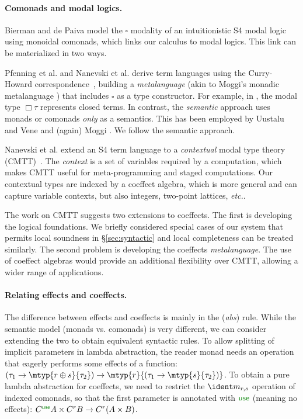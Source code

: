 \vspace{-1em}
\paragraph{Comonads and modal logics.}

Bierman and de Paiva \cite{logic-intuitionistic-modal} model the
$\square$ modality of an intuitionistic S4 modal logic using monoidal
comonads, which links our calculus to modal logics.  This link can be
materialized in two ways.

Pfenning et al. and Nanevski et al.  derive term languages using the Curry-Howard
correspondence~\cite{logic-modal-reconstruction,logic-intuitionistic-modal,logic-cmtt},
building a \emph{metalanguage} (akin to Moggi's monadic metalanguage
\cite{monad-notions}) that includes $\square$ as a type
constructor. For example, in \cite{logic-modal-reconstruction}, the
modal type $\Box \tau$ represents closed terms.
In contrast, the \emph{semantic} approach uses monads or comonads
\emph{only} as a semantics.  This has been employed by Uustalu and
Vene and (again) Moggi \cite{monad-notions,comonads-notions}.  We
follow the semantic approach.

Nanevski et al. extend an S4 term language to a \emph{contextual}
modal type theory (CMTT)~\cite{logic-cmtt}.
The \emph{context} is a set of variables required by a computation, which
makes CMTT useful for meta-programming and staged computations. Our contextual types are
indexed by a coeffect algebra, which is more general and can capture
variable contexts, but also integers, two-point lattices, \emph{etc.}.

The work on CMTT suggests two extensions to coeffects. The first is
developing the logical foundations. We briefly considered special cases
of our system that permits local soundness in \S\ref{sec:syntactic} and
local completeness can be treated similarly. The second problem is 
developing the coeffects \emph{metalanguage}. The use of coeffect algebras
would provide an additional flexibility over CMTT, allowing a wider range 
of applications.


\vspace{-1em}
\paragraph{Relating effects and coeffects.} 
The difference between effects and coeffects is mainly in the (\emph{abs}) rule. While the 
semantic model (monads vs. comonads) is very different, we can consider extending the two to 
obtain equivalent syntactic rules. To allow splitting of implicit parameters in lambda abstraction, 
the reader monad needs an operation that eagerly performs some effects of a function: 
$(\tau_1 \rightarrow \mtyp{r \oplus s}{\tau_2}) \rightarrow \mtyp{r}{(\tau_1 \rightarrow \mtyp{s}{\tau_2})}$.
To obtain a pure lambda abstraction
for coeffects, we need to restrict the $\cmerge_{r, s}$ 
operation of indexed comonads, so that the first parameter is annotated with $\cunit$ (meaning
no effects): $\iftor \cunit A \times \iftor r B \rightarrow \iftor{r}(A \times B)$.

